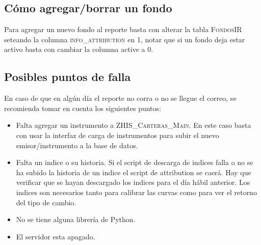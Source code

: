 \documentclass{article}
\begin{document}
\subsection{Cómo agregar/borrar un fondo}
Para agregar un nuevo fondo al reporte basta con alterar la tabla \textsc{FondosIR} seteando la columna \textsc{info\_attribution} en 1, notar que si un fondo deja estar activo basta con cambiar la columna active a 0. 


\subsection{Posibles puntos de falla}


En caso de que en algún día el reporte no corra o no se llegue el correo, se recomienda tomar en cuenta los siguientes puntos:
\begin{itemize}

\item Falta agregar un instrumento a \textsc{ZHIS\_Carteras\_Main}. En este caso basta con usar la interfaz de carga de instrumentos para subir el nuevo emisor/instrumento a la base de datos.

\item Falta un indice o su historia. Si el script de descarga de indices falla o no se ha subido la historia de un indice el script de attribution se caerá. Hay que verificar que se hayan descargado los indices para el día hábil anterior.  Los indices son necesarios tanto para calibrar las curvas como para ver el retorno del tipo de cambio.

\item No se tiene alguna librería de Python.

\item El servidor esta apagado.
\end{itemize}
\end{document}
